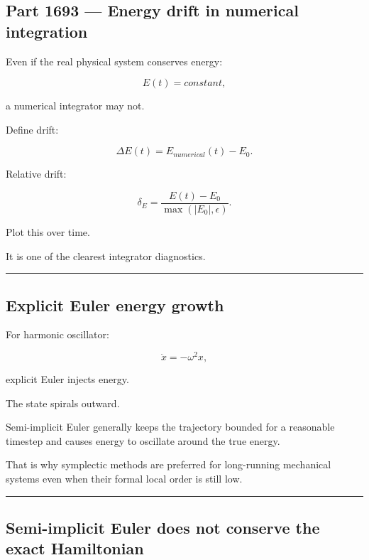 \subsection{Part 1693 --- Energy drift in numerical integration}\label{06-engine-ii-ch039-part-1693-energy-drift-in-numerical-integration}

\hypertarget{06-engine-ii-ch039-part-1693-energy-drift-in-numerical-integration}{}

Even if the real physical system conserves energy:

\[
E(t)=constant,
\]

a numerical integrator may not.

Define drift:

\[
\boxed{
\Delta E(t)
=
E_{numerical}(t)-E_0.
}
\]

Relative drift:

\[
\boxed{
\delta_E
=
\frac{E(t)-E_0}
{\max(|E_0|,\epsilon)}.
}
\]

Plot this over time.

It is one of the clearest integrator diagnostics.

\begin{center}\rule{0.5\linewidth}{0.5pt}\end{center}

\subsection{Explicit Euler energy growth}\label{06-engine-ii-ch039-explicit-euler-energy-growth}

\hypertarget{06-engine-ii-ch039-explicit-euler-energy-growth}{}

For harmonic oscillator:

\[
\ddot x=-\omega^2x,
\]

explicit Euler injects energy.

The state spirals outward.

Semi-implicit Euler generally keeps the trajectory bounded for a reasonable timestep and causes energy to oscillate around the true energy.

That is why symplectic methods are preferred for long-running mechanical systems even when their formal local order is still low.

\begin{center}\rule{0.5\linewidth}{0.5pt}\end{center}

\subsection{Semi-implicit Euler does not conserve the exact Hamiltonian}\label{06-engine-ii-ch039-semi-implicit-euler-does-not-conserve-the-exact-hamiltonian}

